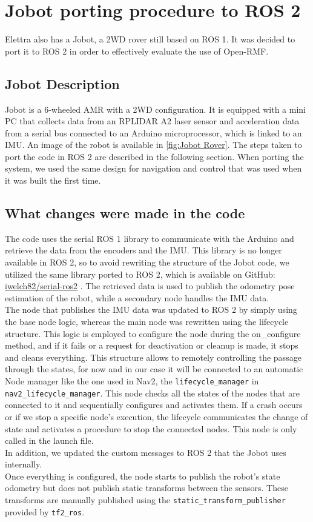 \section{Jobot porting procedure to ROS 2}


Elettra also has a Jobot, a 2WD rover still based on ROS 1. It was decided to port it to ROS 2 in order to effectively evaluate the use of Open-RMF.
\subsection{Jobot Description}
Jobot is a 6-wheeled AMR with a 2WD configuration. It is equipped with a mini PC that collects data from an RPLIDAR A2 laser sensor and acceleration data from a serial bus connected to an Arduino microprocessor, which is linked to an IMU. An image of the robot is available in \ref{fig:Jobot Rover}.
The steps taken to port the code in ROS 2 are described in the following section. When porting the system, we used the same design for navigation and control that was used when it was built the first time\cite{10.1007/978-3-031-45770-8_29}. 

\subsection{What changes were made in the code}

The code uses the serial ROS 1 library to communicate with the Arduino and retrieve the data from the encoders and the IMU. This library is no longer available in ROS 2, so to avoid rewriting the structure of the Jobot code, we utilized the same library ported to ROS 2, which is available on GitHub: 
\href{https://github.com/iwelch82/serial-ros2.git}{iwelch82/serial-ros2} .
The retrieved data is used to publish the odometry pose estimation of the robot, while a secondary node handles the IMU data.\\
The node that publishes the IMU data was updated to ROS 2 by simply using the base node logic, whereas the main node was rewritten using the lifecycle structure. This logic is employed to configure the node during the on\_configure method, and if it fails or a request for deactivation or cleanup is made, it stops and cleans everything. This structure allows to remotely controlling the passage through the states, for now and in our case it will be connected to an automatic Node manager like the one used in Nav2, the \texttt{lifecycle\_manager} in \texttt{nav2\_lifecycle\_manager}. This node checks all the states of the nodes that are connected to it and sequentially configures and activates them. If a crash occurs or if we stop a specific node's execution, the lifecycle communicates the change of state and activates a procedure to stop the connected nodes. This node is only called in the launch file.\\
In addition, we updated the custom messages to ROS 2 that the Jobot uses internally.\\
Once everything is configured, the node starts to publish the robot's state odometry but does not publish static transforms between the sensors. These transforms are manually published using the \texttt{static\_transform\_publisher} provided by \texttt{tf2\_ros}.

